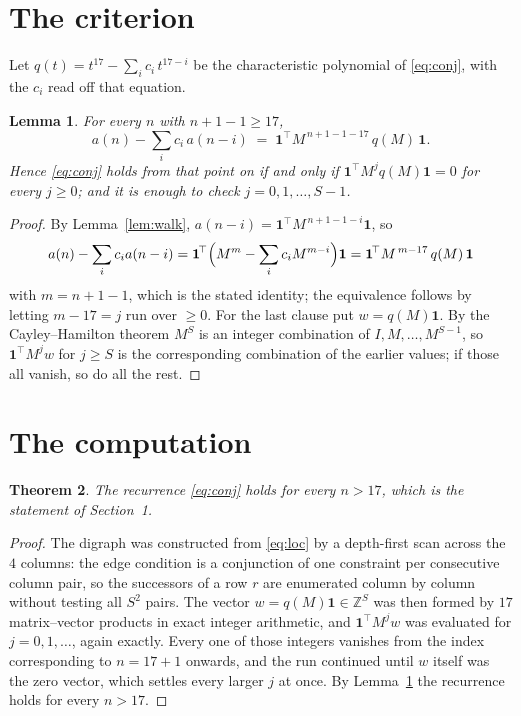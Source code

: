 \documentclass[11pt,a4paper]{article}
\theoremstyle{plain}
\newtheorem{theorem}{Theorem}
\newtheorem{lemma}[theorem]{Lemma}
\theoremstyle{definition}
\begin{document}
\section{The criterion}

Let $q(t)=t^{17}-\sum_i c_i\,t^{17-i}$ be the characteristic polynomial of
\eqref{eq:conj}, with the $c_i$ read off that equation.

\begin{lemma}\label{lem:crit}
For every $n$ with $n+1-1\ge17$,
\[
a(n)-\sum_i c_i\,a(n-i)\;=\;\mathbf{1}^{\!\top}M^{\,n+1-1-17}\,q(M)\,\mathbf{1} .
\]
Hence \eqref{eq:conj} holds from that point on if and only if
$\mathbf{1}^{\!\top}M^{j}q(M)\mathbf{1}=0$ for every $j\ge0$; and it is enough to check
$j=0,1,\dots,S-1$.
\end{lemma}

\begin{proof}
By Lemma~\ref{lem:walk}, $a(n-i)=\mathbf{1}^{\!\top}M^{\,n+1-1-i}\mathbf{1}$, so
\[
a(n)-\sum_i c_i a(n-i)
=\mathbf{1}^{\!\top}\Bigl(M^{m}-\sum_i c_i M^{m-i}\Bigr)\mathbf{1}
=\mathbf{1}^{\!\top}M^{\,m-17}\,q(M)\,\mathbf{1}
\]
with $m=n+1-1$, which is the stated identity; the equivalence follows by letting
$m-17=j$ run over $\ge0$. For the last clause put $w=q(M)\mathbf{1}$. By the
Cayley--Hamilton theorem $M^{S}$ is an integer combination of $I,M,\dots,M^{S-1}$, so
$\mathbf{1}^{\!\top}M^{j}w$ for $j\ge S$ is the corresponding combination of the earlier
values; if those all vanish, so do all the rest.
\end{proof}

\section{The computation}

\begin{theorem}
The recurrence \eqref{eq:conj} holds for every $n>17$, which is the statement of
Section~1.
\end{theorem}

\begin{proof}
The digraph was constructed from \eqref{eq:loc} by a depth-first scan across the $4$
columns: the edge condition is a conjunction of one constraint per consecutive column
pair, so the successors of a row $r$ are enumerated column by column without testing all
$S^2$ pairs. The vector $w=q(M)\mathbf{1}\in\mathbb{Z}^{S}$ was then formed by $17$
matrix--vector products in exact integer arithmetic, and $\mathbf{1}^{\!\top}M^{j}w$ was
evaluated for $j=0,1,\dots$, again exactly. Every one of those integers vanishes from the
index corresponding to $n=17+1$ onwards, and the run continued until $w$ itself was the
zero vector, which settles every larger $j$ at once. By Lemma~\ref{lem:crit} the recurrence
holds for every $n>17$.
\end{proof}
\end{document}
